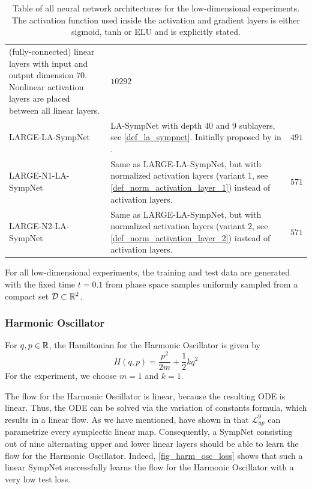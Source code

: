 \documentclass[twoside,a4paper]{article}
\begin{document}
\begin{table}
\begin{tabular}{lp{8cm}c}
		(fully-connected) linear layers with input and output dimension $70$.
		Nonlinear activation layers are placed between all linear layers.
		& $10292$ \\
		LARGE-LA-SympNet & LA-SympNet with depth $40$ and $9$ sublayers, see \cref{def_la_sympnet}.
		Initially proposed by \citeauthor{Jin2020} in \cite{Jin2020}.
		& $491$ \\
		LARGE-N1-LA-SympNet & 
		Same as LARGE-LA-SympNet, but with normalized activation layers (variant 1, 
		see \cref{def_norm_activation_layer_1}) instead of activation layers.
		& $571$ \\
		LARGE-N2-LA-SympNet & 
		Same as LARGE-LA-SympNet, but with normalized activation layers (variant 2, 
		see \cref{def_norm_activation_layer_2}) instead of activation layers.
		& $571$ \\ \bottomrule
	\end{tabular}
	\caption{
	Table of all neural network architectures for the
	low-dimensional experiments. The activation function used inside the activation
	and gradient layers is either sigmoid, tanh or ELU and is explicitly stated.
	}\label{table_low_dim_arch}
\end{table}

For all low-dimensional experiments, the training and test data are generated
with the fixed time $t = 0.1$
from phase space samples uniformly sampled from a compact set $\mathcal{D} \subset \mathbb{R}^2$.

\subsubsection{Harmonic Oscillator}

For $q,p \in \mathbb{R}$, the Hamiltonian for the Harmonic Oscillator is given by
\begin{equation*}
	H(q,p) = \frac{p^2}{2m} + \frac{1}{2} kq^2
\end{equation*}
For the experiment, we choose $m=1$ and $k=1$.

The flow for the Harmonic Oscillator is linear, because the resulting ODE
is linear. Thus, the ODE can be solved via the variation of constants formula,
which results in a linear flow.
As we have mentioned,
\citeauthor{jin2020unit} have shown in \cite{jin2020unit} that $\mathcal{L}^{9}_{up}$
can parametrize every symplectic linear map.
Consequently, a SympNet consisting out of nine alternating 
upper and lower linear layers should be able to learn the flow for the Harmonic Oscillator.
Indeed, \cref{fig_harm_osc_loss} shows that such a linear SympNet successfully 
learns the flow for the Harmonic Oscillator with a very low test loss.
\end{document}

